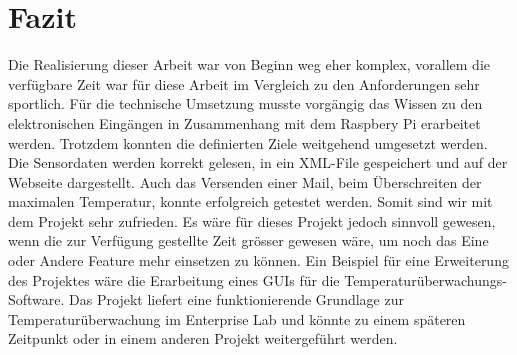 \section{Fazit}
Die Realisierung dieser Arbeit war von Beginn weg eher komplex, vorallem die verfügbare Zeit war für diese Arbeit im Vergleich zu den Anforderungen sehr sportlich. Für die technische Umsetzung musste vorgängig das Wissen zu den elektronischen Eingängen in Zusammenhang mit dem Raspbery Pi erarbeitet werden. Trotzdem konnten die definierten Ziele weitgehend umgesetzt werden. Die Sensordaten werden korrekt gelesen, in ein XML-File gespeichert und auf der Webseite dargestellt. Auch das Versenden einer Mail, beim Überschreiten der maximalen Temperatur, konnte erfolgreich getestet werden. Somit sind wir mit dem Projekt sehr zufrieden. Es wäre für dieses Projekt jedoch sinnvoll gewesen, wenn die zur Verfügung gestellte Zeit grösser gewesen wäre, um noch das Eine oder Andere Feature mehr einsetzen zu können. Ein Beispiel für eine Erweiterung des Projektes wäre die Erarbeitung eines GUIs für die Temperaturüberwachungs-Software. Das Projekt liefert eine funktionierende Grundlage zur Temperaturüberwachung im Enterprise Lab und könnte zu einem späteren Zeitpunkt oder in einem anderen Projekt weitergeführt werden. 
\newpage